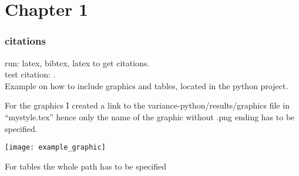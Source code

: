
\section{Chapter 1}\label{sec:chapter1}

\subsubsection{citations}

run: latex, bibtex, latex to get citations.\\

test citation: \cite{andersen2001}.\\

Example on how to include graphics and tables, located in the python project.

For the graphics I created a link to the variance-python/results/graphics file in ``mystyle.tex'' hence only the name of the graphic without .png ending has to be specified.

\texttt{[image: example\_graphic]}

For tables the whole path has to be specified

